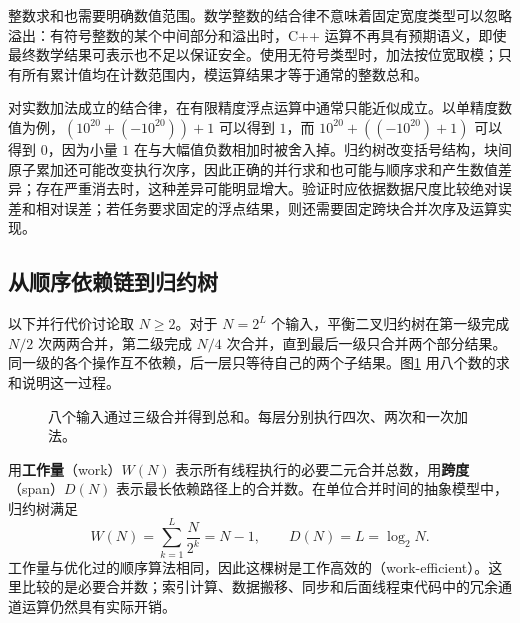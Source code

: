 整数求和也需要明确数值范围。数学整数的结合律不意味着固定宽度类型可以忽略溢出：有符号整数的某个中间部分和溢出时，C++ 运算不再具有预期语义，即使最终数学结果可表示也不足以保证安全。使用无符号类型时，加法按位宽取模；只有所有累计值均在计数范围内，模运算结果才等于通常的整数总和。

对实数加法成立的结合律，在有限精度浮点运算中通常只能近似成立。以单精度数值为例，$(10^{20}+(-10^{20}))+1$ 可以得到 $1$，而 $10^{20}+((-10^{20})+1)$ 可以得到 $0$，因为小量 $1$ 在与大幅值负数相加时被舍入掉。归约树改变括号结构，块间原子累加还可能改变执行次序，因此正确的并行求和也可能与顺序求和产生数值差异；存在严重消去时，这种差异可能明显增大。验证时应依据数据尺度比较绝对误差和相对误差；若任务要求固定的浮点结果，则还需要固定跨块合并次序及运算实现。

\subsection{从顺序依赖链到归约树}

以下并行代价讨论取 $N\geq2$。对于 $N=2^L$ 个输入，平衡二叉归约树在第一级完成 $N/2$ 次两两合并，第二级完成 $N/4$ 次合并，直到最后一级只合并两个部分结果。同一级的各个操作互不依赖，后一层只等待自己的两个子结果。图\ref{l15:fig:tree} 用八个数的求和说明这一过程。

\begin{figure}[htbp]
\centering
{}
\caption{八个输入通过三级合并得到总和。每层分别执行四次、两次和一次加法。}
\label{l15:fig:tree}
\end{figure}

用\textbf{工作量}（work）$W(N)$ 表示所有线程执行的必要二元合并总数，用\textbf{跨度}（span）$D(N)$ 表示最长依赖路径上的合并数。在单位合并时间的抽象模型中，归约树满足
\begin{equation}
W(N)=\sum_{k=1}^{L}\frac{N}{2^k}=N-1,
\qquad D(N)=L=\log_2N.
\label{l15:eq:work-span}
\end{equation}
工作量与优化过的顺序算法相同，因此这棵树是工作高效的（work-efficient）。这里比较的是必要合并数；索引计算、数据搬移、同步和后面线程束代码中的冗余通道运算仍然具有实际开销。

